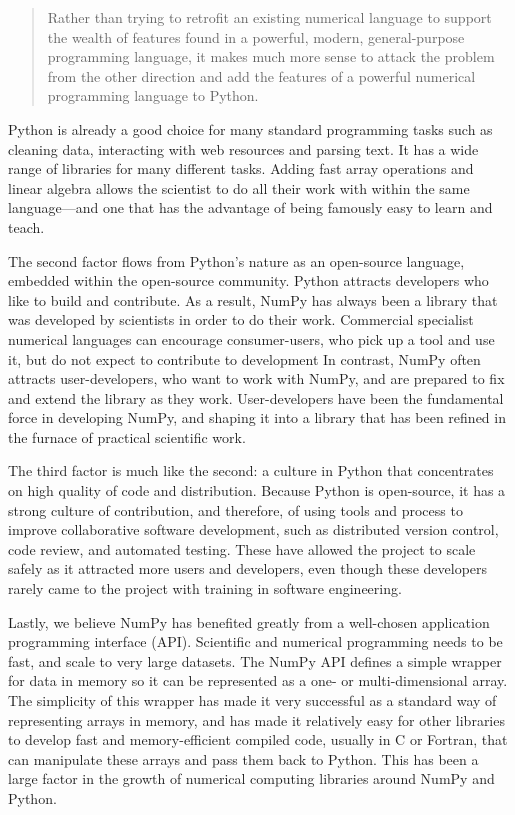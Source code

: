 \begin{quote}
    Rather than trying to retrofit an existing numerical language to support
    the wealth of features found in a powerful, modern, general-purpose
    programming language, it makes much more sense to attack the problem from
    the other direction and add the features of a powerful numerical
    programming language to Python.
\end{quote}

Python is already a good choice for many standard programming tasks such as
cleaning data, interacting with web resources and parsing text.  It has a wide
range of libraries for many different tasks. Adding fast array operations and
linear algebra allows the scientist to do all their work with within the same
language---and one that has the advantage of being famously easy to learn and
teach.

The second factor flows from Python's nature as an open-source language,
embedded within the open-source community.  Python attracts developers who like
to build and contribute.  As a result, NumPy has always been a library that was
developed by scientists in order to do their work.  Commercial specialist
numerical languages can encourage consumer-users, who pick up a tool and use
it, but do not expect to contribute to development%
In contrast, NumPy often
attracts user-developers, who want to work with NumPy, and are prepared to fix
and extend the library as they work. User-developers have been the fundamental
force in developing NumPy, and shaping it into a library that has been refined
in the furnace of practical scientific work.

The third factor is much like the second: a culture in Python that concentrates
on high quality of code and distribution. Because Python is open-source, it has
a strong culture of contribution, and therefore, of using tools and process to
improve collaborative software development, such as distributed version
control, code review, and automated testing.  These have allowed the project to
scale safely as it attracted more users and developers, even though these
developers rarely came to the project with training in software engineering.

Lastly, we believe NumPy has benefited greatly from a well-chosen application
programming interface (API).  Scientific and numerical programming needs to be
fast, and scale to very large datasets.  The NumPy API defines a simple wrapper
for data in memory so it can be represented as a one- or multi-dimensional
array.  The simplicity of this wrapper has made it very successful as a
standard way of representing arrays in memory, and has made it relatively easy
for other libraries to develop fast and memory-efficient compiled code, usually
in C or Fortran, that can manipulate these arrays and pass them back to Python.
This has been a large factor in the growth of numerical computing libraries
around NumPy and Python.

